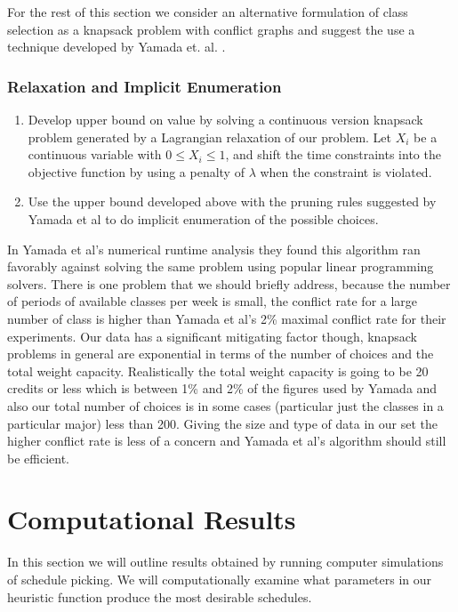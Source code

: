 \documentclass[11pt]{article} %
\begin{document}
For the rest of this section we consider an alternative formulation of class
selection as a knapsack problem with conflict graphs and suggest the use
a technique developed by Yamada et. al. \cite{yamada:heuristic}.

\subsubsection{Relaxation and Implicit Enumeration} \begin{enumerate} \item
Develop upper bound on value by solving a continuous version knapsack problem
generated by a Lagrangian relaxation of our problem.  Let $X_i$ be a continuous
variable with $0 \leq X_i \leq 1$, and shift the time constraints into the
objective function by using a penalty of $\lambda$ when the constraint is
violated.  \item Use the upper bound developed above with the pruning rules
suggested by Yamada et al \cite{yamada:heuristic} to do implicit enumeration of
the possible choices.  \end{enumerate}

In Yamada et al’s \cite{yamada:heuristic} numerical runtime analysis they found
this algorithm ran favorably against solving the same problem using popular
linear programming solvers.  There is one problem that we should briefly address,
because the number of periods of available classes per week is small,
the conflict rate for a large number of class is higher than Yamada
et al’s 2\% maximal conflict rate for their experiments.  Our data has
a significant mitigating factor though, knapsack problems in general are
exponential in terms of the number of choices and the total weight capacity.
Realistically the total weight capacity is going to be 20 credits or less which
is between 1\% and 2\% of the figures used by Yamada \cite{yamada:heuristic} and
also our total number of choices is in some cases (particular just the classes
in a particular major) less than 200.  Giving the size and type of data in our
set the higher conflict rate is less of a concern and Yamada et al’s algorithm
should still be efficient.

\section{Computational Results} In this section we will outline results obtained
by running computer simulations of schedule picking.  We will computationally
examine what parameters in our heuristic function produce the most desirable
schedules.

{}  
\end{document}
